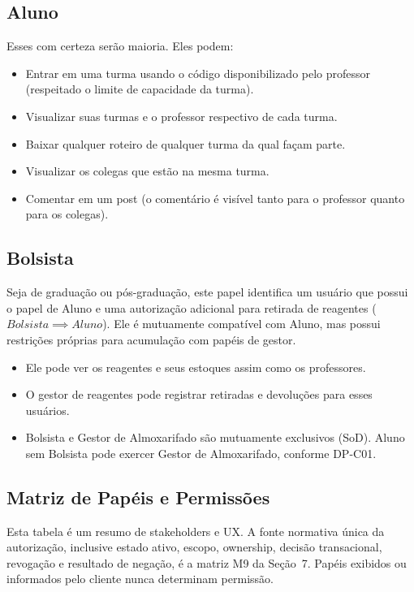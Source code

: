 \subsection{Aluno}
Esses com certeza serão maioria. Eles podem:
\begin{itemize}
    \item Entrar em uma turma usando o código disponibilizado pelo professor (respeitado o limite de capacidade da turma).
    \item Visualizar suas turmas e o professor respectivo de cada turma.
    \item Baixar qualquer roteiro de qualquer turma da qual façam parte.
    \item Visualizar os colegas que estão na mesma turma.
    \item Comentar em um post (o comentário é visível tanto para o professor quanto para os colegas).
\end{itemize}

\subsection{Bolsista}
Seja de graduação ou pós-graduação, este papel identifica um usuário que possui o papel de Aluno e uma autorização adicional para retirada de reagentes ($Bolsista \implies Aluno$). Ele é mutuamente compatível com Aluno, mas possui restrições próprias para acumulação com papéis de gestor.
\begin{itemize}
    \item Ele pode ver os reagentes e seus estoques assim como os professores.
    \item O gestor de reagentes pode registrar retiradas e devoluções para esses usuários.
    \item Bolsista e Gestor de Almoxarifado são mutuamente exclusivos (SoD). Aluno sem Bolsista pode exercer Gestor de Almoxarifado, conforme DP-C01.
\end{itemize}

\subsection{Matriz de Papéis e Permissões}
Esta tabela é um resumo de stakeholders e UX. A fonte normativa única da
autorização, inclusive estado ativo, escopo, ownership, decisão transacional,
revogação e resultado de negação, é a matriz M9 da Seção~7. Papéis exibidos ou
informados pelo cliente nunca determinam permissão.



